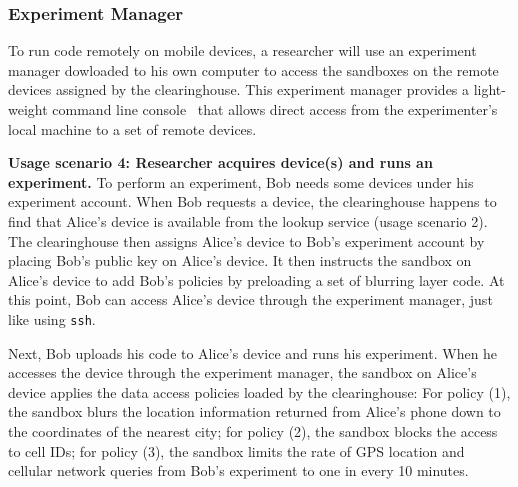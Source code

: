 \subsubsection{Experiment Manager}\label{sec-emt}

To run code remotely on mobile devices, a researcher will use an
experiment manager dowloaded to his own computer 
to access the sandboxes on the remote devices assigned by the clearinghouse. 
This experiment manager provides a light-weight command line 
console~\cite{demo-kit} that allows direct access from the 
experimenter's local machine to a set of remote devices. 

\textbf{Usage scenario 4: Researcher acquires device(s) and runs an experiment.}
To perform an experiment, Bob needs some devices under his 
experiment account. 
%
When Bob requests a device, the clearinghouse
happens to find that Alice's device is available from the lookup service
(usage scenario 2). The clearinghouse then 
assigns Alice's device to Bob's experiment account by placing Bob's
public key on Alice's device. It then instructs 
the sandbox on Alice's device to add Bob's policies by preloading
a set of blurring layer code. At this point, Bob can access Alice's 
device through the experiment manager, just like using \texttt{ssh}.

Next, Bob uploads his code to Alice's device and 
runs his experiment. When he accesses the device through
the experiment manager, the sandbox on Alice's device 
applies the data access policies loaded by the clearinghouse: For 
policy (1), the sandbox blurs the location
information returned from Alice's phone down to the coordinates
of the nearest city; for policy (2), the sandbox blocks the
access to cell IDs; for policy (3), the sandbox limits the rate
of GPS location and cellular network queries from Bob's
experiment to one in every 10 minutes.

